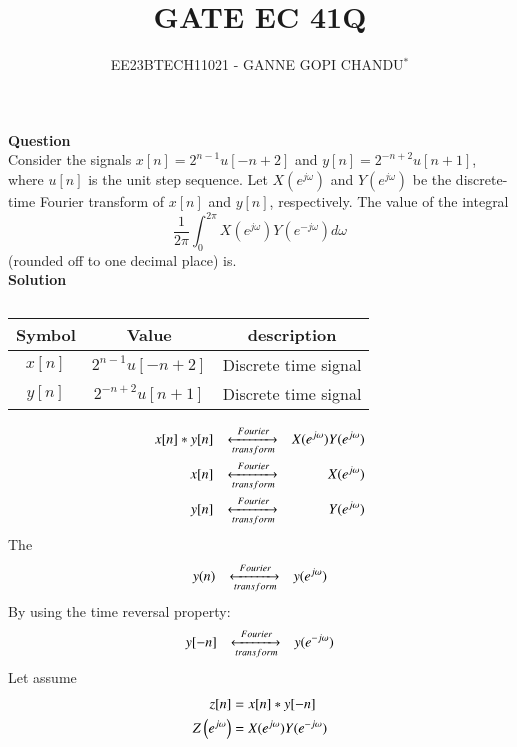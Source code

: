 \documentclass[journal,12pt,twocolumn]{IEEEtran}
\theoremstyle{remark}
\begin{document}

\vspace{3cm}
\title{GATE EC 41Q}
\author{EE23BTECH11021 - GANNE GOPI CHANDU$^{*}$%
}
\maketitle
\bigskip
\renewcommand{\thefigure}{\theenumi}
\renewcommand{\thetable}{\theenumi}

\textbf{Question}\\
Consider the signals \(x[n] = 2^{n-1} u[-n+2]\) and \(y[n] = 2^{-n+2} u[n+1]\), where \(u[n]\) is the unit step sequence. Let \(X(e^{j\omega})\) and \(Y(e^{j\omega})\) be the discrete-time Fourier transform of \(x[n]\) and \(y[n]\), respectively. The value of the integral
\[
\frac{1}{2\pi} \int_{0}^{2\pi} X(e^{j\omega}) Y(e^{-j\omega}) d\omega
\]
(rounded off to one decimal place) is.\\
\textbf{Solution}\\
\fi
\begin{table}[!h]
\begin{center}
\renewcommand\thetable{1}
\begin{tabular}{ |c|c|c| } 
  \hline
    Symbol & Value & description \\ 
  \hline
  $x[n] $ & $2^{n-1}u[-n+2]$ & Discrete time signal  \\ 
  \hline
  $y[n] $ & $2^{-n+2}u[n+1]$ & Discrete time signal  \\ 
  \hline
\end{tabular}
\end{center}
\caption{}
\end{table}
\begin{align}
     x[n]*y[n] && \xleftrightarrow[transform]{Fourier} && X(e^{j\omega}) Y(e^{j\omega})\\
 x[n] && \xleftrightarrow [transform]{Fourier} && X(e^{j\omega}) \\
 y[n] && \xleftrightarrow [transform]{Fourier} && Y(e^{j\omega}) 
\end{align}
The
 \begin{align}
       y(n) && \xleftrightarrow [transform]{Fourier} && y(e^{j\omega})
\end{align}
By using the time reversal property:
\begin{align}
y[-n] && \xleftrightarrow [transform]{Fourier} && y(e^{-j\omega})
\end{align}
Let assume
\begin{align}
     z[n]& = x[n] * y[-n]\\
     Z\left(e^{j \omega}\right) &=X(e^{j\omega}) Y(e^{-j\omega})
 \end{align}
\end{document}
